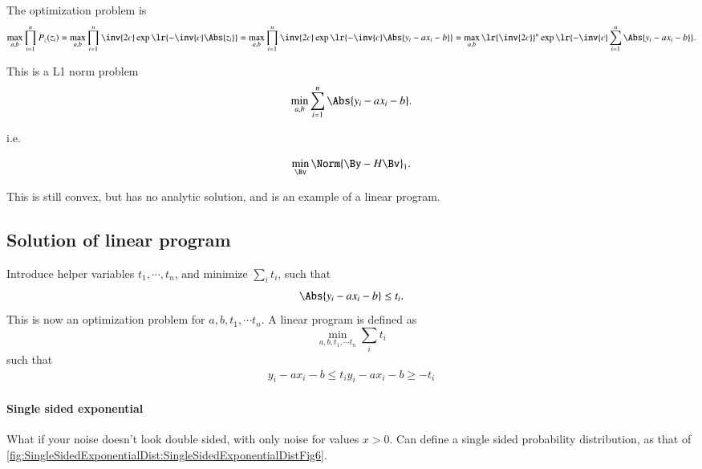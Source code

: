 The optimization problem is
\begin{dmath}\label{eqn:L1introduction:480}
\max_{a,b} \prod_{i = 1}^n P_z(z_i)
=
\max_{a,b} \prod_{i = 1}^n
\inv{2 c} \exp\lr{ -\inv{c} \Abs{z_i} }
=
\max_{a,b} \prod_{i = 1}^n
\inv{2 c} \exp\lr{ -\inv{c} \Abs{y_i - a x_i - b} }
=
\max_{a,b}
\lr{\inv{2 c}}^n \exp\lr{ -\inv{c} \sum_{i=1}^n \Abs{y_i - a x_i - b} }.
\end{dmath}

This is a L1 norm problem
\begin{dmath}\label{eqn:L1introduction:500}
\min_{a,b} \sum_{i = 1}^n \Abs{ y_i - a x_i - b }.
\end{dmath}

i.e.

\begin{dmath}\label{eqn:L1introduction:520}
\min_\Bv \Norm{ \By - H \Bv }_1.
\end{dmath}

This is still convex, but has no analytic solution, and is an example of a linear program.
\subsection{Solution of linear program}
Introduce helper variables \( t_1, \cdots, t_n \), and
minimize \( \sum_i t_i \), such that
\begin{dmath}\label{eqn:L1introduction:540}
\Abs{ y_i - a x_i - b } \le t_i.
\end{dmath}
This is now an optimization problem for \( a, b, t_1, \cdots t_n \).  A linear program is defined as
\begin{dmath}\label{eqn:L1introduction:560}
\min_{a, b, t_1, \cdots t_n} \sum_i t_i
\end{dmath}
such that
\begin{dmath}\label{eqn:L1introduction:580}
\begin{aligned}
y_i - a x_i - b \le t_i
y_i - a x_i - b \ge -t_i
\end{aligned}
\end{dmath}
\paragraph{Single sided exponential}
What if your noise doesn't look double sided, with only noise for values \( x > 0 \).  Can define a single sided probability distribution, as that of \cref{fig:SingleSidedExponentialDist:SingleSidedExponentialDistFig6}.

